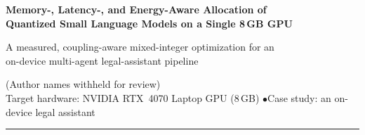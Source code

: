 \documentclass[11pt]{article}
\begin{document}
\begin{center}
{\LARGE\bfseries Memory-, Latency-, and Energy-Aware Allocation of\\[2pt]
Quantized Small Language Models on a Single 8\,GB GPU\par}
\vspace{6pt}
{\large A measured, coupling-aware mixed-integer optimization for an\\
on-device multi-agent legal-assistant pipeline\par}
\vspace{8pt}
{\normalsize (Author names withheld for review)}\\
\vspace{2pt}
{\small Target hardware: NVIDIA RTX~4070 Laptop GPU (8\,GB) \quad$\bullet$\quad Case study: an on-device legal assistant}
\end{center}

\vspace{4pt}
\hrule
\vspace{8pt}
\end{document}
